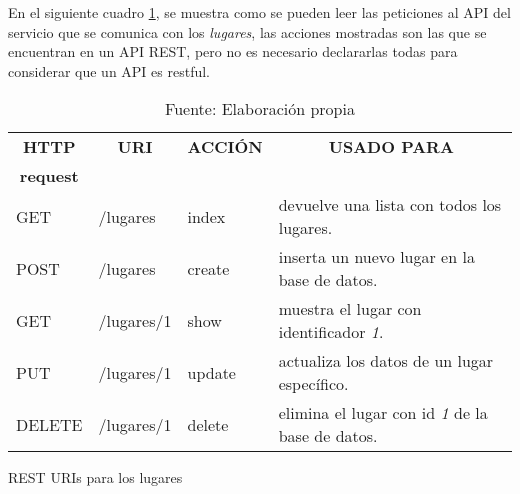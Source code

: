 



  En el siguiente cuadro \ref{tab:rest}, se muestra como se pueden leer las peticiones al API del servicio que se comunica con los \emph{lugares}, las acciones mostradas son las que se encuentran en un API REST, pero no es necesario declararlas todas para considerar que un API es restful.\\


  \begin{table}[H]
    \begin{center}

      \begin{tabularx}{0.75\textwidth}{ l l l  X }
        \toprule
        \multicolumn{1}{c}{\textbf{HTTP}} &
        \multicolumn{1}{c}{\textbf{URI}}  &
        \multicolumn{1}{c}{\textbf{ACCI\'ON}} &
        \multicolumn{1}{c}{\textbf{USADO PARA}}  \\
        \multicolumn{1}{c}{\textbf{request}} & & & \\

        \midrule
        GET     &  /lugares    &  index    & devuelve una lista con todos los lugares.\\
        POST    &  /lugares    &  create   & inserta un nuevo lugar en la base de datos.\\
        GET     &  /lugares/1  &  show     & muestra el lugar con identificador \emph{1}.\\
        PUT     &  /lugares/1  &  update   & actualiza los datos de un lugar específico.\\
        DELETE  &  /lugares/1  &  delete   & elimina el lugar con id \emph{1} de la base de datos.\\
        \bottomrule
      \end{tabularx}

      \caption{REST URIs para los lugares}
      \label{tab:rest}

      \caption*{Fuente: Elaboración propia}
    \end{center}
  \end{table}


